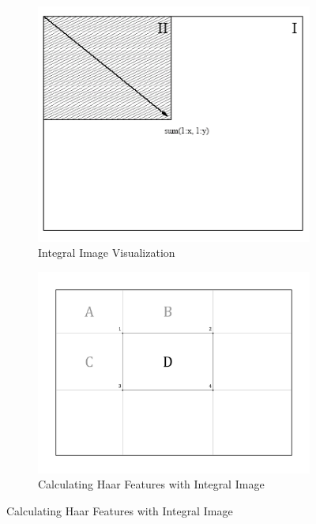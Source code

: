 \begin{figure}[h]
	\centering
	\begin{subfigure}[t]{0.45\linewidth}
		\includegraphics[width=\linewidth]{img/integral_image}
		\caption{Integral Image Visualization}
		\label{fig:integralimage}
	\end{subfigure}
	\begin{subfigure}[t]{0.45\linewidth}
	\includegraphics[width=\linewidth]{img/integral_image_haar}
	\caption{Calculating Haar Features with Integral Image}
	\label{fig:integralimagehaar}
	\end{subfigure}
\end{figure}

